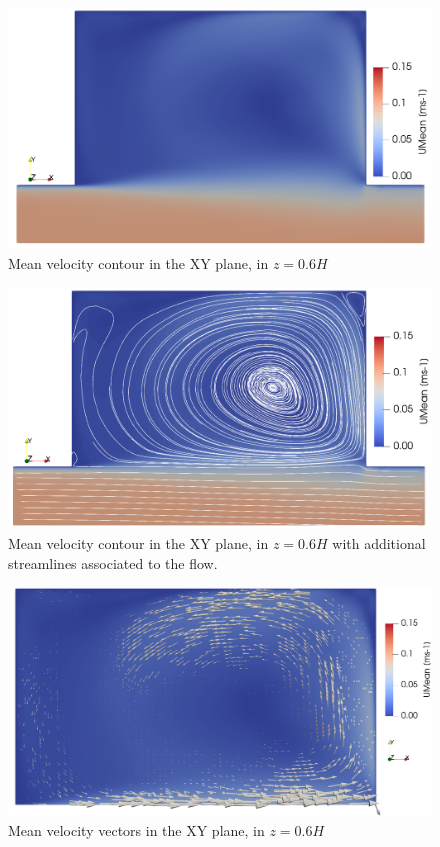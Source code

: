 \begin{figure}[!ht]
\centering
\includegraphics[width=\linewidth]{../images/art3/imgEst2.png}
\caption{Mean velocity contour in the XY plane, in $z=0.6H$}
\label{fig:art3:velCont}
\end{figure}
\begin{figure}[!ht]
\centering
\includegraphics[width=\linewidth]{../images/art3/imgEst3.png}
\caption{Mean velocity contour in the XY plane, in $z=0.6H$ with additional streamlines associated to the flow.}
\label{fig:art3:streamlines}
\end{figure}
\begin{figure}[!ht]
\centering
\includegraphics[width=\linewidth]{../images/art3/imgEst4.png}
\caption{Mean velocity vectors in the XY plane, in $z=0.6H$}
\label{fig:art3:vectors}
\end{figure}
